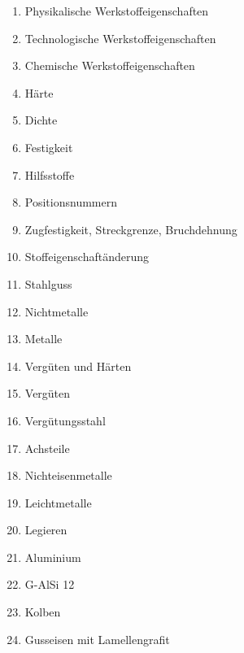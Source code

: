 \begin{enumerate}
\item
  Physikalische Werkstoffeigenschaften\\
\item
  Technologische Werkstoffeigenschaften\\
\item
  Chemische Werkstoffeigenschaften\\
\item
  Härte\\
\item
  Dichte\\
\item
  Festigkeit\\
\item
  Hilfsstoffe\\
\item
  Positionsnummern\\
\item
  Zugfestigkeit, Streckgrenze, Bruchdehnung\\
\item
  Stoffeigenschaftänderung\\
\item
  Stahlguss\\
\item
  Nichtmetalle\\
\item
  Metalle\\
\item
  Vergüten und Härten\\
\item
  Vergüten\\
\item
  Vergütungsstahl\\
\item
  Achsteile\\
\item
  Nichteisenmetalle\\
\item
  Leichtmetalle\\
\item
  Legieren\\
\item
  Aluminium\\
\item
  G-AlSi 12\\
\item
  Kolben\\
\item
  Gusseisen mit Lamellengrafit\\

\end{enumerate}
